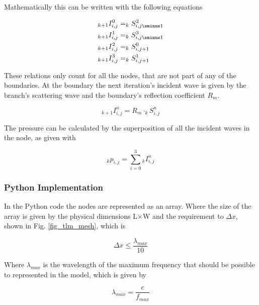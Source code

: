 \documentclass[twocolumn]{article}
\begin{document}
Mathematically this can be written with the following equations

\begin{equation}
\begin{aligned}
    _{k+1}I_{i,j}^{0} &= _{k}S_{i,j\sminus 1}^{2} \\
    _{k+1}I_{i,j}^{1} &= _{k}S_{i,j\sminus 1}^{3} \\
    _{k+1}I_{i,j}^{2} &= _{k}S_{i,j+1}^{0} \\
    _{k+1}I_{i,j}^{3} &= _{k}S_{i,j+1}^{1} \\
\end{aligned}
\label{eq_propagation}
\end{equation}

These relations only count for all the nodes, that are not part of any of the boundaries.
At the boundary the next iteration's incident wave is given by the branch's
scattering wave and the boundary's reflection coefficient $R_{m}$.

\begin{equation}
    _{k+1}I_{i,j}^{n} = R_{m}\cdot _{k}S_{i,j}^{n}
    \label{eq_boundary_propagation}
\end{equation}

The pressure can be calculated by the superposition of all the incident waves in the node,
as given with

\begin{equation}
    _{k}p_{i,j} = \sum_{i=0}^{3} {}_kI_{i,j}^{n}
\end{equation}

\subsubsection{Python Implementation}
In the Python code the nodes are represented as an array.
Where the size of the array is given by the physical dimensions L$\times$W and
the requirement to $\Delta x$, shown in Fig. \ref{fig_tlm_mesh}, which is

\begin{equation}
    \Delta x \leq \frac{\lambda_{max}}{10}
    \label{eq_delta_x}
\end{equation}

Where $\lambda_{max}$ is the wavelength of the maximum frequency that should be possible
to represented in the model, which is given by

\begin{equation}
    \lambda_{max} = \frac{c}{f_{max}}
    \label{eq_max_wavelength}
\end{equation}
\end{document}
